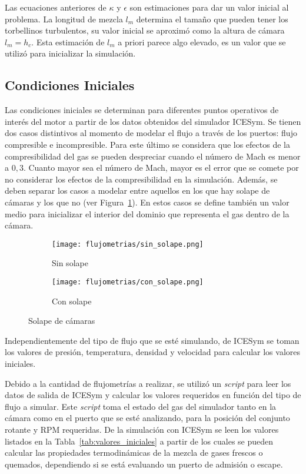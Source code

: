 Las ecuaciones anteriores de  $\kappa$ y $\epsilon$ son estimaciones para dar un
valor inicial al problema.
%
La longitud de mezcla $l_m$ determina el tamaño que pueden tener los torbellinos
turbulentos, su valor inicial se aproximó como la altura de cámara $l_m = h_c$.
%
Esta estimación de $l_{m}$ a priori parece algo elevado, es un valor que se
utilizó para inicializar la simulación.


\subsection{Condiciones Iniciales}\label{cap2:cond_iniciales}
%
Las condiciones iniciales se determinan para diferentes puntos operativos de
interés del motor a partir de los datos obtenidos del simulador ICESym.
%
Se tienen dos casos distintivos al momento de modelar el flujo a través de los
puertos: flujo compresible e incompresible.
%
Para este último se considera que los efectos de la compresibilidad del gas se
pueden despreciar cuando el número de Mach es menor a $0,3$.
%
Cuanto mayor sea el número de Mach, mayor es el error que se comete por no
considerar los efectos de la compresibilidad en la simulación.
%
Además, se deben separar los casos a modelar entre aquellos en los que hay
solape de cámaras y los que no (ver Figura~\ref{fig:solape}).
%
En estos casos se define también un valor medio para inicializar el interior del
dominio que representa el gas dentro de la cámara.

\begin{figure}[t!]  \centering
    \begin{subfigure}[t]{0.4\textwidth} \centering
\texttt{[image: flujometrias/sin\_solape.png]}
        \caption{Sin solape}
    \end{subfigure}%
    \begin{subfigure}[t]{0.4\textwidth} \centering
\texttt{[image: flujometrias/con\_solape.png]}
        \caption{Con solape}
    \end{subfigure}
  \caption{Solape de cámaras}\label{fig:solape}
\end{figure}

Independientemente del tipo de flujo que se esté simulando, de ICESym se toman
los valores de presión, temperatura, densidad y velocidad para calcular los
valores iniciales.

Debido a la cantidad de flujometrías a realizar, se utilizó un \emph{script}
para leer los datos de salida de ICESym y calcular los valores requeridos en
función del tipo de flujo a simular.
%
Este \emph{script} toma el estado del gas del simulador tanto en la cámara como
en el puerto que se esté analizando, para la posición del conjunto rotante y RPM
requeridas.
%
De la simulación con ICESym se leen los valores listados en la
Tabla~\ref{tab:valores_iniciales} a partir de los cuales se pueden calcular las
propiedades termodinámicas de la mezcla de gases frescos o quemados, dependiendo
si se está evaluando un puerto de admisión o escape.

